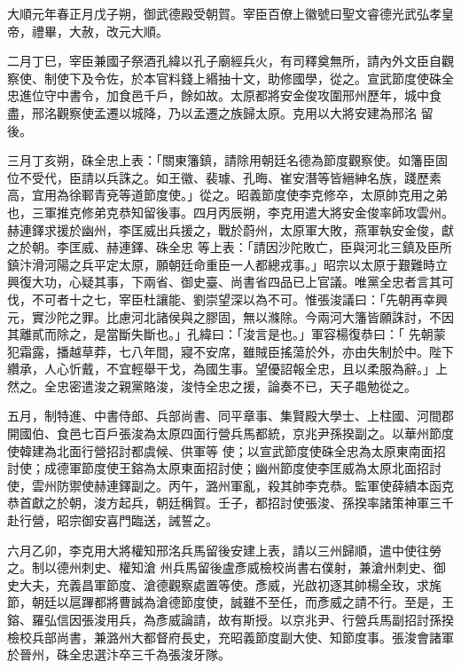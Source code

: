 \begin{pinyinscope}
 大順元年春正月戊子朔，御武德殿受朝賀。宰臣百僚上徽號曰聖文睿德光武弘孝皇帝，禮畢，大赦，改元大順。



 二月丁巳，宰臣兼國子祭酒孔緯以孔子廟經兵火，有司釋奠無所，請內外文臣自觀察使、制使下及令佐，於本官料錢上緡抽十文，助修國學，從之。宣武節度使硃全忠進位守中書令，加食邑千戶，餘如故。太原都將安金俊攻圍邢州歷年，城中食盡，邢洺觀察使孟遷以城降，乃以孟遷之族歸太原。克用以大將安建為邢洺
 留後。



 三月丁亥朔，硃全忠上表：「關東籓鎮，請除用朝廷名德為節度觀察使。如籓臣固位不受代，臣請以兵誅之。如王徽、裴璩、孔晦、崔安潛等皆縉紳名族，踐歷素高，宜用為徐鄆青兗等道節度使。」從之。昭義節度使李克修卒，太原帥克用之弟也，三軍推克修弟克恭知留後事。四月丙辰朔，李克用遣大將安金俊率師攻雲州。赫連鐸求援於幽州，李匡威出兵援之，戰於蔚州，太原軍大敗，燕軍執安金俊，獻之於朝。李匡威、赫連鐸、硃全忠
 等上表：「請因沙陀敗亡，臣與河北三鎮及臣所鎮汴滑河陽之兵平定太原，願朝廷命重臣一人都總戎事。」昭宗以太原于艱難時立興復大功，心疑其事，下兩省、御史臺、尚書省四品已上官議。唯黨全忠者言其可伐，不可者十之七，宰臣杜讓能、劉崇望深以為不可。惟張浚議曰：「先朝再幸興元，實沙陀之罪。比慮河北諸侯與之膠固，無以滌除。今兩河大籓皆願誅討，不因其離貳而除之，是當斷失斷也。」孔緯曰：「浚言是也。」軍容楊復恭曰：「
 先朝蒙犯霜露，播越草莽，七八年間，寢不安席，雖賊臣搖蕩於外，亦由失制於中。陛下纘承，人心忻戴，不宜輕舉干戈，為國生事。望優詔報全忠，且以柔服為辭。」上然之。全忠密遣浚之親黨賂浚，浚恃全忠之援，論奏不已，天子黽勉從之。



 五月，制特進、中書侍郎、兵部尚書、同平章事、集賢殿大學士、上柱國、河間郡開國伯、食邑七百戶張浚為太原四面行營兵馬都統，京兆尹孫揆副之。以華州節度使韓建為北面行營招討都虞候、供軍等
 使；以宣武節度使硃全忠為太原東南面招討使；成德軍節度使王鎔為太原東面招討使；幽州節度使李匡威為太原北面招討使，雲州防禦使赫連鐸副之。丙午，潞州軍亂，殺其帥李克恭。監軍使薛繢本函克恭首獻之於朝，浚方起兵，朝廷稱賀。壬子，都招討使張浚、孫揆率諸策神軍三千赴行營，昭宗御安喜門臨送，誡誓之。



 六月乙卯，李克用大將權知邢洺兵馬留後安建上表，請以三州歸順，遣中使往勞之。制以德州刺史、權知滄
 州兵馬留後盧彥威檢校尚書右僕射，兼滄州刺史、御史大夫，充義昌軍節度、滄德觀察處置等使。彥威，光啟初逐其帥楊全玫，求旄節，朝廷以扈蹕都將曹誠為滄德節度使，誠雖不至任，而彥威之請不行。至是，王鎔、羅弘信因張浚用兵，為彥威論請，故有斯授。以京兆尹、行營兵馬副招討孫揆檢校兵部尚書，兼潞州大都督府長史，充昭義節度副大使、知節度事。張浚會諸軍於晉州，硃全忠選汴卒三千為張浚牙隊。




\end{pinyinscope}
